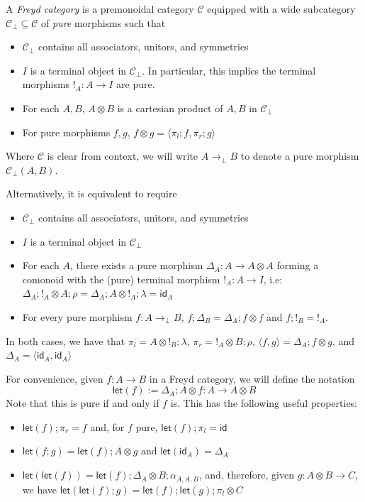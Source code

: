 \documentclass[acmsmall,screen,review]{acmart}
\newcommand{\mc}[1]{\ensuremath{\mathcal{#1}}}
\newcommand{\ms}[1]{\ensuremath{\mathsf{#1}}}
\newcommand{\tmor}[1]{{!}_{#1}}
\newcommand{\dmor}[1]{{\Delta}_{#1}}
\newcommand{\lmor}[1]{\ms{let}(#1)}
\begin{document}
\begin{definition}
  A \emph{Freyd category} is a premonoidal category $\mc{C}$ equipped with a wide subcategory
  $\mc{C}_\bot \subseteq \mc{C}$ of \emph{pure} morphisms such that
  \begin{itemize}
    \item $\mc{C}_\bot$ contains all associators, unitors, and symmetries
    \item $I$ is a terminal object in $\mc{C}_\bot$. In particular, this implies the terminal
    morphisms $!_A: A \to I$ are pure.
    \item For each $A, B$, $A \otimes B$ is a cartesian product of $A, B$ in $\mc{C}_\bot$
    \item For pure morphisms $f, g$, $f \otimes g = \langle \pi_l; f, \pi_r ; g  \rangle$
  \end{itemize}
  Where $\mc{C}$ is clear from context, we will write $A \to_\bot B$ to denote a pure morphism
  $\mc{C}_\bot(A, B)$.

  Alternatively, it is equivalent to require
  \begin{itemize}
    \item $\mc{C}_\bot$ contains all associators, unitors, and symmetries
    \item $I$ is a terminal object in $\mc{C}_\bot$
    \item For each $A$, there exists a pure morphism $\dmor{A} : A \to A \otimes A$ forming a
          comonoid with the (pure) terminal morphism $\tmor{A} : A \to I$, i.e: $\dmor{A} ; \tmor{A}
          \otimes A ; \rho = \dmor{A} ; A \otimes \tmor {A} ; \lambda = \ms{id}_A$
    \item For every pure morphism $f : A \to_\bot B$, $f ; \dmor{B} = \dmor{A} ; f \otimes f$
          and $f ; !_B = !_A$.  
  \end{itemize}
  In both cases, we have that $\pi_l = A \otimes \tmor{B} ; \lambda$, $\pi_r = \tmor{A}
  \otimes B ; \rho$, $\langle f, g \rangle = \dmor{A} ; f \otimes g$, and $\dmor{A} = \langle
  \ms{id}_A, \ms{id}_A \rangle$
\end{definition}
For convenience, given $f : A \to B$ in a Freyd category, we will define the notation
\begin{equation}
  \lmor{f} := \dmor{A} ; A \otimes f : A \to A \otimes B
\end{equation}
Note that this is pure if and only if $f$ is. This has the following useful properties:
\begin{itemize}
  \item $\lmor{f} ; \pi_r = f$ and, for $f$ pure, $\lmor{f} ; \pi_l = \ms{id}$
  \item $\lmor{f;g} = \lmor{f} ; A \otimes g$ and $\lmor{\ms{id}_A} = \dmor{A}$
  \item $\lmor{\lmor{f}} = \lmor{f} ; \dmor{A} \otimes B ; \alpha_{A, A, B}$, and, therefore, given
  $g: A \otimes B \to C$, we have $\lmor{\lmor{f};g} = \lmor{f} ; \lmor{g} ; \pi_l \otimes C$
\end{itemize}
\end{document}
